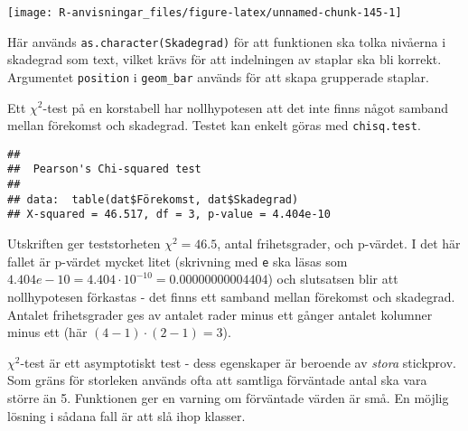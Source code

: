 \documentclass[
]{book}
\newenvironment{Shaded}{\begin{snugshade}}{\end{snugshade}}
\newcommand{\CommentTok}[1]{\textcolor[rgb]{0.56,0.35,0.01}{\textit{#1}}}
\newcommand{\FunctionTok}[1]{\textcolor[rgb]{0.00,0.00,0.00}{#1}}
\newcommand{\NormalTok}[1]{#1}
\newcommand{\OtherTok}[1]{\textcolor[rgb]{0.56,0.35,0.01}{#1}}
\newcommand{\SpecialCharTok}[1]{\textcolor[rgb]{0.00,0.00,0.00}{#1}}
\theoremstyle{definition}
\theoremstyle{definition}
\theoremstyle{definition}
\theoremstyle{definition}
\theoremstyle{remark}
\begin{document}
\begin{center}\texttt{[image: R-anvisningar\_files/figure-latex/unnamed-chunk-145-1]} \end{center}

Här används \texttt{as.character(Skadegrad)} för att funktionen ska tolka nivåerna i skadegrad som text, vilket krävs för att indelningen av staplar ska bli korrekt. Argumentet \texttt{position} i \texttt{geom\_bar} används för att skapa grupperade staplar.

Ett \(\chi^2\)-test på en korstabell har nollhypotesen att det inte finns något samband mellan förekomst och skadegrad. Testet kan enkelt göras med \texttt{chisq.test}.

\begin{Shaded}
\end{Shaded}

\begin{verbatim}
## 
##  Pearson's Chi-squared test
## 
## data:  table(dat$Förekomst, dat$Skadegrad)
## X-squared = 46.517, df = 3, p-value = 4.404e-10
\end{verbatim}

Utskriften ger teststorheten \(\chi^2 = 46.5\), antal frihetsgrader, och p-värdet. I det här fallet är p-värdet mycket litet (skrivning med \texttt{e} ska läsas som \(4.404e-10 = 4.404 \cdot 10^{-10} = 0.00000000004404\)) och slutsatsen blir att nollhypotesen förkastas - det finns ett samband mellan förekomst och skadegrad. Antalet frihetsgrader ges av antalet rader minus ett gånger antalet kolumner minus ett (här \((4-1) \cdot (2-1) = 3\)).

\(\chi^2\)-test är ett asymptotiskt test - dess egenskaper är beroende av \emph{stora} stickprov. Som gräns för storleken används ofta att samtliga förväntade antal ska vara större än 5. Funktionen ger en varning om förväntade värden är små. En möjlig lösning i sådana fall är att slå ihop klasser.

\begin{Shaded}
\end{Shaded}
\end{document}
